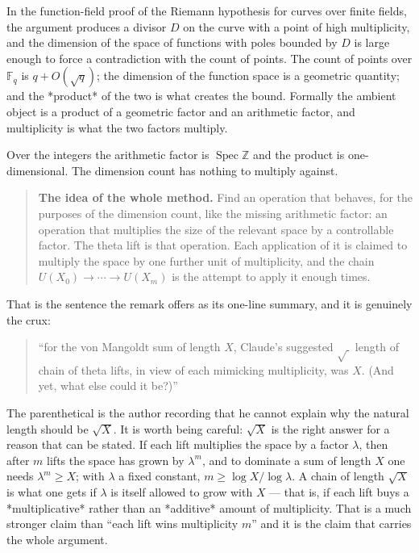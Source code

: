 In the function-field proof of the Riemann hypothesis for curves over finite
fields, the argument produces a divisor $D$ on the curve with a point of high
multiplicity, and the dimension of the space of functions with poles bounded by
$D$ is large enough to force a contradiction with the count of points. The
count of points over $\mathbb{F}_q$ is $q + O(\sqrt q)$; the dimension of the
function space is a geometric quantity; and the *product* of the two is what
creates the bound. Formally the ambient object is a product of a geometric
factor and an arithmetic factor, and multiplicity is what the two factors
multiply.

Over the integers the arithmetic factor is $\operatorname{Spec}\mathbb{Z}$ and
the product is one-dimensional. The dimension count has nothing to multiply
against.

\begin{quote}
\textbf{The idea of the whole method.} Find an operation that behaves, for the
purposes of the dimension count, like the missing arithmetic factor: an
operation that multiplies the size of the relevant space by a controllable
factor. The theta lift is that operation. Each application of it is claimed to
multiply the space by one further unit of multiplicity, and the chain
$U(X_0) \to \cdots \to U(X_m)$ is the attempt to apply it enough times.
\end{quote}

That is the sentence the remark offers as its one-line summary, and it is
genuinely the crux:

\begin{quote}
\small
``for the von Mangoldt sum of length $X$, Claude's suggested $\sqrt{\ }$ length of
chain of theta lifts, in view of each mimicking multiplicity, was $X$. (And yet,
what else could it be?)''
\end{quote}

The parenthetical is the author recording that he cannot explain why the
natural length should be $\sqrt{X}$. It is worth being careful: $\sqrt{X}$ is
the right answer for a reason that can be stated. If each lift multiplies the
space by a factor $\lambda$, then after $m$ lifts the space has grown by
$\lambda^m$, and to dominate a sum of length $X$ one needs $\lambda^m \ge X$;
with $\lambda$ a fixed constant, $m \ge \log X / \log \lambda$. A chain of
length $\sqrt{X}$ is what one gets if $\lambda$ is itself allowed to grow with
$X$ --- that is, if each lift buys a *multiplicative* rather than an
*additive* amount of multiplicity. That is a much stronger claim than ``each
lift wins multiplicity $m$'' and it is the claim that carries the whole
argument.

